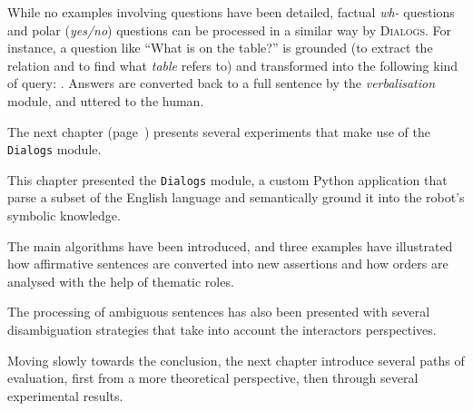  
While no examples involving questions have been detailed, factual \emph{wh-}
questions and polar (\emph{yes/no}) questions can be processed in a similar way
by \textsc{Dialogs}. For instance, a question like ``What is on the table?'' is
grounded (to extract the relation  and to find what \emph{table}
refers to) and transformed into the following kind of query: .  Answers are converted back to a full sentence by
the \emph{verbalisation} module, and uttered to the human.


The next chapter (page~\pageref{chapter|evaluation}) presents several
experiments that make use of the {\tt Dialogs} module.

\recap

This chapter presented the {\tt Dialogs} module, a custom Python application
that parse a subset of the English language and semantically ground it into the
robot's symbolic knowledge.

The main algorithms have been introduced, and three examples have illustrated
how affirmative sentences are converted into new assertions and how orders are
analysed with the help of thematic roles.

The processing of ambiguous sentences has also been presented with several
disambiguation strategies that take into account the interactors perspectives.

Moving slowly towards the conclusion, the next chapter introduce several paths
of evaluation, first from a more theoretical perspective, then through several
experimental results.

